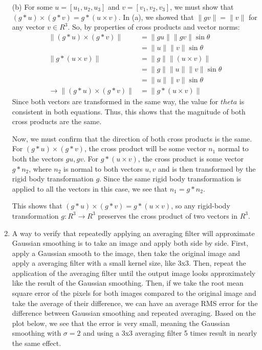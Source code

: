 \documentclass[12pt]{article}
\begin{document}
\begin{enumerate}
	\item[(b)] For some  $u = [u_1, u_2, u_3]$ and $v = [v_1, v_2, v_3]$, we must show that $(g * u) \times (g * v) = g * (u \times v)$. In (a), we showed that $\|gv\| = \|v\|$ for any vector $v \in R^3$. So, by properties of cross products and vector norms:
	\begin{align*}
	\| (g * u) \times (g * v) \| &= \|gu\| \|gv\| \sin\theta \\
	&= \|u\| \|v\| \sin\theta \\
	\|g * (u \times v)\| &= \|g \| \|(u \times v)\| \\
	&= \|g \| \|u\| \|v\| \sin\theta \\
	&= \|u\| \|v\| \sin\theta \\
	\rightarrow \| (g * u) \times (g * v) \| &= \|g * (u \times v)\|
	\end{align*}
	Since both vectors are transformed in the same way, the value for $theta$ is consistent in both equations. Thus, this shows that the magnitude of both cross products are the same. 
	
	Now, we must confirm that the direction of both cross products is the same. For $(g * u) \times (g * v)$, the cross product will be some vector $n_1$ normal to both the vectors $gu, gv$. For $g * (u \times v)$, the cross product is some vector $g * n_2$, where $n_2$ is normal to both vectors $u, v$ and is then transformed by the rigid body transformation $g$. Since the same rigid body transformation is applied to all the vectors in this case, we see that $n_1 = g * n_2$. 
	
	This shows that $(g * u) \times (g * v) = g * (u \times v)$, so any rigid-body transformation $g: R^3 \rightarrow R^3$ preserves the cross product of two vectors in $R^3$.

	\item A way to verify that repeatedly applying an averaging filter will approximate Gaussian smoothing is to take an image and apply both side by side. First, apply a Gaussian smooth to the image, then take the original image and apply a averaging filter with a small kernel size, like 3x3. Then, repeat the application of the averaging filter until the output image looks approximately like the result of the Gaussian smoothing. Then, if we take the root mean square error of the pixels for both images compared to the original image and take the average of their difference, we can have an average RMS error for the difference between Gaussian smoothing and repeated averaging. Based on the plot below, we see that the error is very small, meaning the Gaussian smoothing with $\sigma=2$ and using a 3x3 averaging filter 5 times result in nearly the same effect.
	

\end{enumerate}
\end{document}

